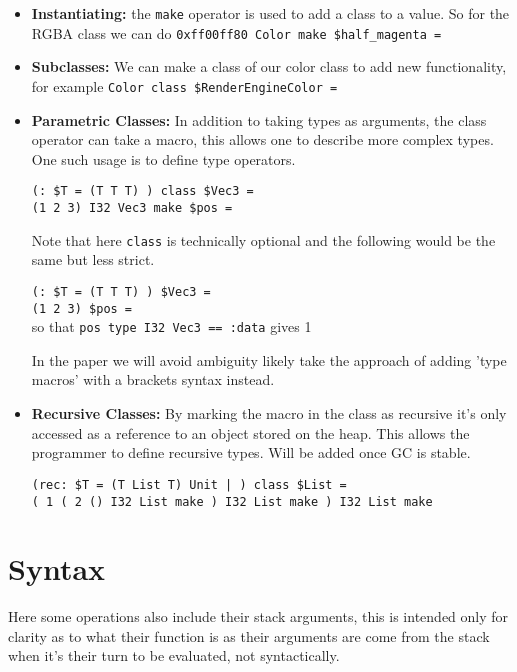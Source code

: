 \documentclass[acmsmall, review]{acmart}
\theoremstyle{definition}
\begin{document}
\begin{itemize}
    \begin{itemize}
        \item \textbf{Instantiating:} the \texttt{make} operator is used to add a class to a value. So for the RGBA class we can do \texttt{0xff00ff80 Color make \$half\_magenta =}

        \item \textbf{Subclasses:} We can make a class of our color class to add new functionality, for example \texttt{Color class \$RenderEngineColor =}

        \item \textbf{Parametric Classes:} In addition to taking types as arguments, the class operator can take a macro, this allows one to describe more complex types. One such usage is to define type operators.

        \texttt{(: \$T = (T T T) ) class \$Vec3 =}\\
        \texttt{(1 2 3) I32 Vec3 make \$pos =}

        Note that here \texttt{class} is technically optional and the following would be the same but less strict.

        \texttt{(: \$T = (T T T) ) \$Vec3 =}\\
        \texttt{(1 2 3) \$pos =}\\
        so that \texttt{pos type I32 Vec3 == :data} gives 1

        In the paper we will avoid ambiguity likely take the approach of adding 'type macros' with a brackets syntax instead.

        \item \textbf{Recursive Classes:} By marking the macro in the class as recursive it's only accessed as a reference to an object stored on the heap. This allows the programmer to define recursive types. Will be added once GC is stable.

        \texttt{(rec: \$T = (T List T) Unit | ) class \$List =}\\
        \texttt{( 1 ( 2 () I32 List make ) I32 List make ) I32 List make}
    \end{itemize}
\end{itemize}

\section{Syntax}
Here some operations also include their stack arguments, this is intended only for clarity as to what their function is as their arguments are come from the stack when it's their turn to be evaluated, not syntactically.
\end{document}
